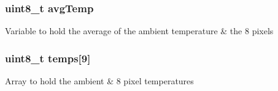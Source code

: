 \subsubsection[{avg\+Temp}]{\setlength{\rightskip}{0pt plus 5cm}uint8\+\_\+t avg\+Temp}\label{thermal_sensor_8h_ae2fc39671c0173304986f05dba26bbbf}
Variable to hold the average of the ambient temperature \& the 8 pixels 
\subsubsection[{temps}]{\setlength{\rightskip}{0pt plus 5cm}uint8\+\_\+t temps[9]}\label{thermal_sensor_8h_a303bfbfba8466a335e14331344e03ed7}
Array to hold the ambient \& 8 pixel temperatures 